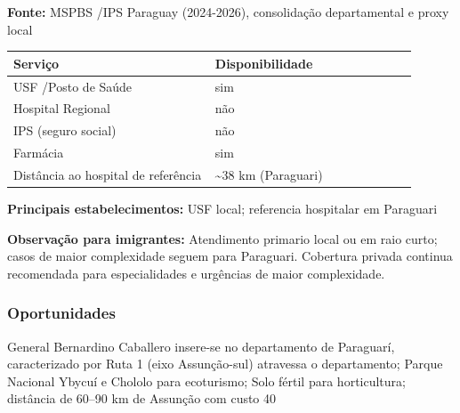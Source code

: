 \textbf{Fonte:} MSPBS /\allowbreak  IPS Paraguay (2024-2026), consolidação
departamental e proxy local

{\def\LTcaptype{none} %
\begin{longtable}{@{}>{\raggedright\arraybackslash}p{0.45\linewidth} >{\raggedright\arraybackslash}p{0.45\linewidth}@{}}
\toprule\noalign{}
Serviço & Disponibilidade \\
\midrule\noalign{}
\endhead
\bottomrule\noalign{}
\endlastfoot
USF /\allowbreak  Posto de Saúde & sim \\
Hospital Regional & não \\
IPS (seguro social) & não \\
Farmácia & sim \\
Distância ao hospital de referência & \textasciitilde38 km
(Paraguari) \\
\end{longtable}
}

\textbf{Principais estabelecimentos:} USF local; referencia hospitalar
em Paraguari

\textbf{Observação para imigrantes:} Atendimento primario local ou em
raio curto; casos de maior complexidade seguem para Paraguari. Cobertura
privada continua recomendada para especialidades e urgências de maior
complexidade.
\newpage

\subsubsection*{Oportunidades}\label{oport-general-bernardino-caballero-0912}
General Bernardino Caballero insere-se no departamento de Paraguarí, caracterizado por Ruta 1 (eixo Assunção-sul) atravessa o departamento; Parque Nacional Ybycuí e Chololo para ecoturismo; Solo fértil para horticultura; distância de 60–90 km de Assunção com custo 40%

